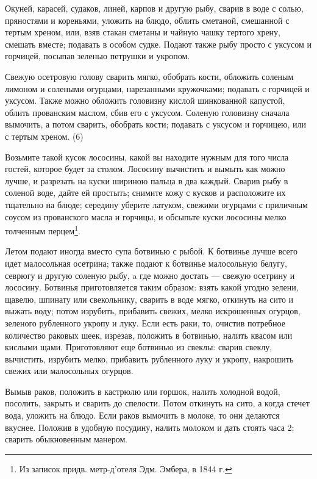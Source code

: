 
Окуней, карасей, судаков, линей, карпов и другую рыбу, сварив в воде с солью, пряностями и кореньями, уложить на блюдо, облить сметаной, смешанной с тертым хреном, или, взяв стакан сметаны и чайную чашку тертого хрену, смешать вместе; подавать в особом судке. Подают также рыбу просто с уксусом и горчицей, посыпав зеленью петрушки и укропом.


Свежую осетровую голову сварить мягко, обобрать кости, обложить соленым лимоном и солеными огурцами, нарезанными кружочками; подавать с горчицей и уксусом. Также можно обложить головизну кислой шинкованной капустой, облить прованским маслом, сбив его с уксусом. Соленую головизну сначала вымочить, а потом сварить, обобрать кости; подавать с уксусом и горчицею, или с тертым хреном. (6)


Возьмите такой кусок лососины, какой вы находите нужным для того числа гостей, которое будет за столом. Лососину вычистить и вымыть как можно лучше, и разрезать на куски шириною пальца в два каждый. Сварив рыбу в соленой воде, дайте ей простыть; снимите кожу с кусков и расположите их тщательно на блюде; середину уберите латуком, свежими огурцами с приличным соусом из прованского масла и горчицы, и обсыпьте куски лососины мелко толченным перцем\footnote{Из записок придв. метр-д'отеля Эдм. Эмбера, в 1844 г.}.


Летом подают иногда вместо супа ботвинью с рыбой. К ботвинье лучше всего идет малосольная осетрина; также подают к ботвинье малосольную белугу, севрюгу и другую соленую рыбу, a где можно достать — свежую осетрину и лососину. Ботвинья приготовляется таким образом: взять какой угодно зелени, щавелю, шпинату или свекольнику, сварить в воде мягко, откинуть на сито и выжать воду; потом изрубить, прибавить свежих, мелко искрошенных огурцов, зеленого рубленного укропу и луку. Если есть раки, то, очистив потребное количество раковых шеек, изрезав, положить в ботвинью, налить квасом или кислыми щами. Приготовляют еще ботвинью из свеклы: сварив свеклу, вычистить, изрубить мелко, прибавить рубленного луку и укропу, накрошить свежих или малосольных огурцов.


Вымыв раков, положить в кастрюлю или горшок, налить холодной водой, посолить, закрыть и сварить до спелости. Потом откинуть на сито, а когда стечет вода, уложить на блюдо. Если раков вымочить в молоке, то они делаются вкуснее. Положив в удобную посудину, налить молоком и дать стоять часа 2; сварить обыкновенным манером.

